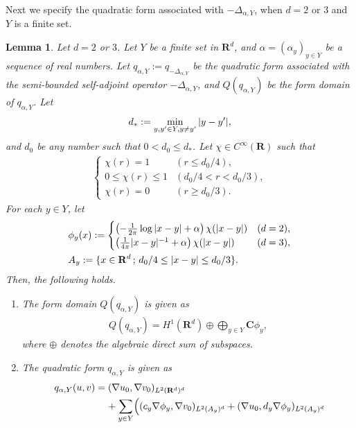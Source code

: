 \documentclass[12pt,a4paper]{article}
\newtheorem{lemma}[theorem]{Lemma}
\def\min{\mathop{\rm min}\limits}
\begin{document}
Next we specify the quadratic form 
associated with  $-\Delta_{\alpha, Y}$,
when $d=2$ or $3$ and $Y$ is a finite set.
\begin{lemma}
 \label{lemma_quadratic-form}
Let $d=2$ or $3$.
Let $Y$ be a finite set in $\mathbf{R}^d$,
and $\alpha=(\alpha_y)_{y\in Y}$ be a sequence of real numbers.
Let $q_{\alpha,Y}:=q_{-\Delta_{\alpha,Y}}$ be the quadratic form 
associated with
the semi-bounded self-adjoint operator $-\Delta_{\alpha,Y}$,
and $Q(q_{\alpha,Y})$ be the form domain of $q_{\alpha,Y}$.
Let
\begin{align*}
 d_*:=\min_{y,y'\in Y, y\not=y'}|y-y'|,
\end{align*}
and $d_0$ be any number such that $0<d_0\leq d_*$.
Let $\chi\in C^\infty(\mathbf{R})$ such that
\begin{align*}
\begin{cases}
\chi(r)= 1 & (r\leq d_0/4),\\
0\leq \chi(r)\leq 1 &(d_0/4<r<d_0/3 ),\\
\chi(r)=0 & (r\geq d_0/3).
\end{cases}
\end{align*}
For each $y\in Y$, let
\begin{align*}
& \phi_y(x):=
\begin{cases}
 \left(-\frac{1}{2\pi}\log|x-y|+\alpha\right)\chi(|x-y|)
&(d=2),\\
 \left(\frac{1}{4\pi}|x-y|^{-1}+\alpha\right)\chi(|x-y|)
&(d=3),
\end{cases}
\\
& A_y:=\{x\in \mathbf{R}^d\,;\,d_0/4\leq |x-y|\leq d_0/3\}.
\notag
\end{align*}
Then, the following holds.
\begin{enumerate}
\item[(1)]
The form domain $Q(q_{\alpha,Y})$
is given as
\begin{align}
\label{06_09}
Q(q_{\alpha,Y})
=
H^1(\mathbf{R}^d)\oplus \bigoplus_{y\in Y}\mathbf{C}\phi_y,
\end{align}
where $\oplus$ denotes the algebraic direct sum of subspaces.
 \item[(2)]
The quadratic form $q_{\alpha,Y}$
is given as
\begin{align}
&\  q_{\alpha,Y}(u,v)
= 
(\nabla u_0,\nabla v_0)_{L^2(\mathbf{R}^d)^d}\notag\\
&\hspace{2cm}+
\sum_{y\in Y}
\Bigl(
(c_y \nabla \phi_y,\nabla v_0)_{L^2(A_y)^d}
+
(\nabla u_0,d_y \nabla \phi_y)_{L^2(A_y)^d}
\notag\\

\end{align}
\end{enumerate}
\end{lemma}
\end{document}
